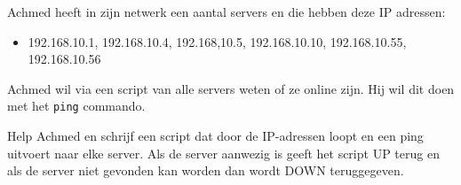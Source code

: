 Achmed heeft in zijn netwerk een aantal servers en die hebben deze IP adressen:
\begin{itemize}
\item 192.168.10.1, 192.168.10.4, 192.168,10.5, 192.168.10.10, 192.168.10.55, 192.168.10.56
\end{itemize}

Achmed wil via een script van alle servers weten of ze online zijn. Hij wil dit doen met het \texttt{ping} commando.

Help Achmed en schrijf een script dat door de IP-adressen loopt en een ping uitvoert naar elke server. Als de server aanwezig is geeft het script UP terug en als de server niet gevonden kan worden dan wordt DOWN teruggegeven.

